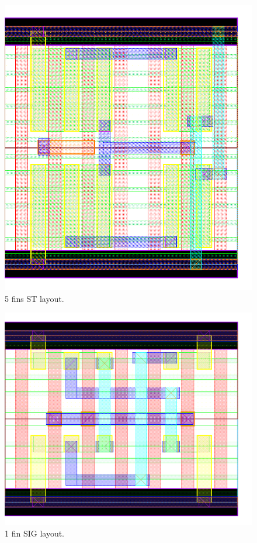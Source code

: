 \documentclass[pgmicro,mestrado,english]{iiufrgs}
\begin{document}
\begin{figure}[]
\centering
\includegraphics[width=\textwidth,height=\textheight,keepaspectratio]{ST5F.png}
\caption{5 fins ST layout.}
\label{fig:ST5F}
\end{figure}






\begin{figure}[]
\centering
\includegraphics[width=\textwidth,height=\textheight,keepaspectratio]{SIG1F.png}
\caption{1 fin SIG layout.}
\label{fig:SIG1F}
\end{figure}
\end{document}
